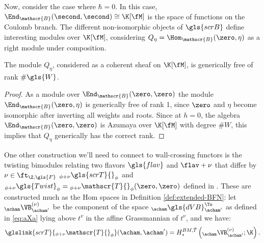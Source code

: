  
Now, consider the case where $\hbar=0$.  In this case,
$\End_{\mathscr{B}}(\second,\second)\cong \K[\fM]$ is the space of functions on the
  Coulomb branch.  The different non-isomorphic objects of
  $\gls{scrB}$ define interesting modules over $\K[\fM]$, considering
  $Q_{\eta}=\Hom_{\mathscr{B}}(\zero,\eta)$ as a right module under composition.   
\begin{lemma}\label{lem:Q-rank}
  The module $Q_{\eta}$, considered as a coherent sheaf on $\K[\fM]$, is generically free of rank $\# \gls{W}$.
\end{lemma} 
\begin{proof}
  As a module over $\End_{\mathscr{B}}(\zero,\zero)$ the module $\End_{\mathscr{B}}(\zero,\eta)$ is generically free of rank 1, since $\zero$ and $\eta$ become isomorphic after inverting all weights and roots.  Since at $h=0$, the algebra $\End_{\mathscr{B}}(\zero,\zero)$ is Azumaya over $\K[\fM]$ with degree $\#W$, this implies that $Q_{\eta}$ generically has the correct rank.  
\end{proof}

One other construction we'll need to connect to wall-crossing functors
is the twisting bimodules relating two flavors $\gls{flav}$ and
$\flav+\nu$ that differ by $\nu\in \ft_{\Z,\gls{F}}$
  ${}_{\phi+\nu}\gls{scrT}{}_{\phi}$ 
and
${}_{\phi+\nu}\gls{Twist}_{\phi}={}_{\phi+\nu}\mathscr{T}{}_{\phi}(\zero,\zero)$
defined in \cite[Def. 3.16]{WebSD}.
These are constructed much as the Hom spaces in Definition
\ref{def:extended-BFN}: let ${}_{\acham}\VB^{(\nu)}_{\acham'}$ be the
component of the space ${}_{\acham}\gls{dVB}^{\To}_{\acham'}$  as defined in
\eqref{eq:aXa} lying above $t^\nu$ in the affine Grassmannian of
$t^\nu$, and we have:
\begin{equation}
  \label{eq:aXnua}
 \glslink{scrT}{ {}_{\phi+\nu}\mathscr{T}{}_{\phi}}(\acham,\acham')=  H_*^{BM, \tilde T}\left({}_{\acham}\VB^{(\nu)}_{\acham'}; 
    \K\right).
\end{equation}



